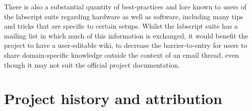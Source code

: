 There is also a substantial quantity of best-practices and lore known to users of the labscript suite regarding hardware as well as software, including many tips and tricks that are specific to certain setups. Whilst the labscript suite has a mailing list in which much of this information is exchanged, it would benefit the project to have a user-editable wiki, to decrease the barrier-to-entry for users to share domain-specific knowledge outside the context of an email thread, even though it may not suit the official project documentation.

\section{Project history and attribution}

\begin{figure}
    \centering
    \\

\end{figure}
